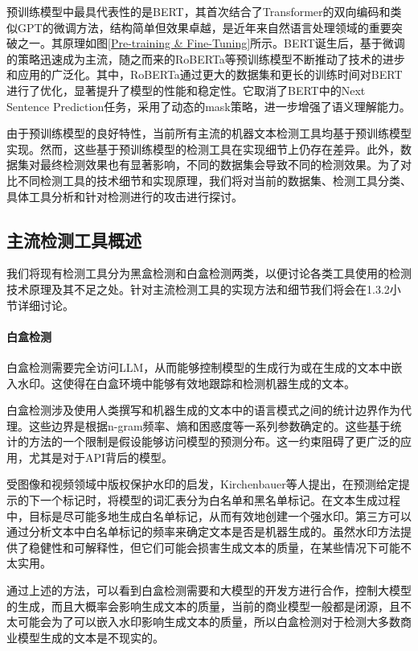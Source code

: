 \documentclass[a4paper]{report}
\begin{document}
预训练模型中最具代表性的是BERT，其首次结合了Transformer的双向编码和类似GPT的微调方法，结构简单但效果卓越，是近年来自然语言处理领域的重要突破之一。其原理如图\ref{Pre-training & Fine-Tuning}所示\cite{devlin2018bert}。BERT诞生后，基于微调的策略迅速成为主流，随之而来的RoBERTa等预训练模型不断推动了技术的进步和应用的广泛化。其中，RoBERTa通过更大的数据集和更长的训练时间对BERT进行了优化，显著提升了模型的性能和稳定性。它取消了BERT中的Next Sentence Prediction任务，采用了动态的mask策略，进一步增强了语义理解能力\cite{liu2019roberta}。

由于预训练模型的良好特性，当前所有主流的机器文本检测工具均基于预训练模型实现。然而，这些基于预训练模型的检测工具在实现细节上仍存在差异。此外，数据集对最终检测效果也有显著影响，不同的数据集会导致不同的检测效果。为了对比不同检测工具的技术细节和实现原理，我们将对当前的数据集、检测工具分类、具体工具分析和针对检测进行的攻击进行探讨。

\subsection{主流检测工具概述}
我们将现有检测工具分为黑盒检测和白盒检测两类，以便讨论各类工具使用的检测技术原理及其不足之处。针对主流检测工具的实现方法和细节我们将会在1.3.2小节详细讨论。
\paragraph{白盒检测}
白盒检测需要完全访问LLM，从而能够控制模型的生成行为或在生成的文本中嵌入水印。这使得在白盒环境中能够有效地跟踪和检测机器生成的文本。

白盒检测涉及使用人类撰写和机器生成的文本中的语言模式之间的统计边界作为代理。这些边界是根据n-gram频率\cite{badaskar2008identifying}、熵\cite{lavergne2008detecting}和困惑度\cite{beresneva2016computer}等一系列参数确定的。这些基于统计的方法的一个限制是假设能够访问模型的预测分布。这一约束阻碍了更广泛的应用，尤其是对于API背后的模型。

受图像和视频领域中版权保护水印的启发，Kirchenbauer等人提出，在预测给定提示的下一个标记时，将模型的词汇表分为白名单和黑名单标记。在文本生成过程中，目标是尽可能多地生成白名单标记，从而有效地创建一个强水印。第三方可以通过分析文本中白名单标记的频率来确定文本是否是机器生成的\cite{kirchenbauer2023watermark}。虽然水印方法提供了稳健性和可解释性，但它们可能会损害生成文本的质量，在某些情况下可能不太实用。

通过上述的方法，可以看到白盒检测需要和大模型的开发方进行合作，控制大模型的生成，而且大概率会影响生成文本的质量，当前的商业模型一般都是闭源，且不太可能会为了可以嵌入水印影响生成文本的质量，所以白盒检测对于检测大多数商业模型生成的文本是不现实的。
\end{document}
